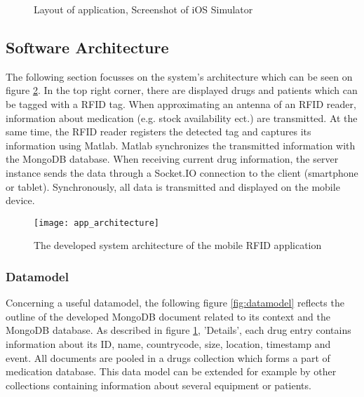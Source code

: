 \begin{figure}
\centering
{}
\caption{\label{fig:app_screenshot}Layout of application, Screenshot of iOS Simulator}
\end{figure}

\subsection{Software Architecture} \label{section_architecture}

The following section focusses on the system's architecture which can be seen on figure \ref{fig:apparchitecture}. In the top right corner, there are displayed drugs and patients which can be tagged with a RFID tag. When approximating an antenna of an RFID reader, information about medication (e.g. stock availability ect.) are transmitted. At the same time, the RFID reader registers the detected tag and captures its information using Matlab. Matlab synchronizes the transmitted information with the MongoDB database. When receiving current drug information, the server instance sends the data through a Socket.IO connection to the client (smartphone or tablet). Synchronously, all data is transmitted and displayed on the mobile device.

\begin{figure}
\centering
\texttt{[image: app\_architecture]} 
\caption{\label{fig:apparchitecture}The developed system architecture of the mobile RFID application} 
\end{figure}

\subsubsection{Datamodel}

Concerning a useful datamodel, the following figure \ref{fig:datamodel} reflects the outline of the developed MongoDB document related to its context and the MongoDB database. As described in figure \ref{fig:app_screenshot}, 'Details', each drug entry contains information about its ID, name, countrycode, size, location, timestamp and event. All documents are pooled in a drugs collection which forms a part of medication database. This data model can be extended for example by other collections containing information about several equipment or patients. 


